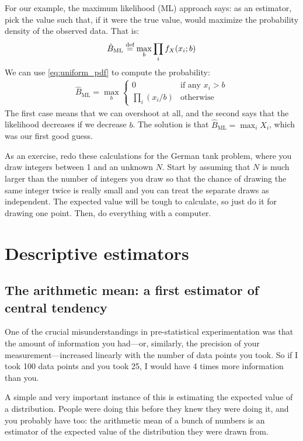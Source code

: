 For our example, the maximum likelihood (ML) approach says: as an estimator, pick
the value such that, if it were the true value, would maximize the probability
density of the observed data. That is:
\begin{equation}
\hat{B}_\text{ML} \stackrel{\text{def}}{=} \max_b \prod_i f_X(x_i; b)
\end{equation}
We can use \eqref{eq:uniform_pdf} to compute the probability:
\begin{align*}
\hat{B}_\text{ML} = \max_b \begin{cases}
0 &\text{if any $x_i > b$} \\
\prod_i (x_i/b) &\text{otherwise}
\end{cases}
\end{align*}
The first case means that we can overshoot at all, and the second says that
the likelihood decreases if we decrease $b$. The solution is that
$\hat{B}_\text{ML} = \max_i X_i$, which was our first good guess.

As an exercise, redo these calculations for the German tank problem, where you
draw integers between 1 and an unknown $N$. Start by assuming that $N$ is much
larger than the number of integers you draw so that the chance of drawing the
same integer twice is really small and you can treat the separate draws as
independent. The expected value will be tough to calculate, so just do it for
drawing one point. Then, do everything with a computer.

\section{Descriptive estimators}

\subsection{The arithmetic mean: a first estimator of central tendency}

One of the crucial misunderstandings in pre-statistical experimentation was
that the amount of information you had---or, similarly, the precision of your
measurement---increased linearly with the number of data points you took. So
if I took 100 data points and you took 25, I would have 4 times more
information than you.

A simple and very important instance of this is estimating the expected value
of a distribution. People were doing this before they knew they were doing it,
and you probably have too: the arithmetic mean of a bunch of numbers is an
estimator of the expected value of the distribution they were drawn from.

